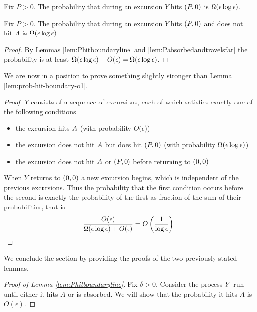 {\begin{lemma}
  \label{lem:Pabsorbedandtravelsfar}
  Fix $P > 0$.  The probability that during an excursion $Y$ hits $(P,0)$
  is $\Omega(\epsilon\log\epsilon)$.
\end{lemma}

\begin{lemma*}
  Fix $P > 0$.  The probability that during an excursion $Y$ hits $(P,0)$
  and does not hit $A$ is $\Omega(\epsilon\log\epsilon)$.
\end{lemma*}

\begin{proof}
  By Lemmas \ref{lem:Phitboundaryline} and
  \ref{lem:Pabsorbedandtravelsfar} the probability is at least
  $\Omega(\epsilon\log\epsilon) - O(\epsilon) = \Omega(\epsilon\log\epsilon)$.
\end{proof}

We are now in a position to prove something slightly stronger than
Lemma \ref{lem:prob-hit-boundary-o1}.

\begin{lemma*}
\end{lemma*}

\newcommand{\Oe}{O(\epsilon)}

\begin{proof}
  $Y$ consists of a sequence of excursions, each of which satisfies
  exactly one of the following conditions
  \begin{itemize}
  \item the excursion hits $A$ (with probability
    $O(\epsilon$))
  \item the excursion does not hit $A$ but does hit
    $(P,0)$ (with probability $\Omega(\epsilon\log\epsilon)$)
  \item the excursion does not hit $A$ or $(P,0)$ before
    returning to $(0,0)$
  \end{itemize}
  When $Y$ returns to $(0,0)$ a new excursion begins, which is independent of
  the previous excursions.  Thus the probability that the first
  condition occurs before the second is exactly the probability of the
  first as fraction of the sum of their probabilities, that is
  \[
  \frac{\Oe}{\Omegaeloge + \Oe} = O\left(\frac{1}{\log\epsilon}\right)
  \]
\end{proof}

We conclude the section by providing the proofs of the two previously
stated lemmas.

\begin{proof}[Proof of Lemma \ref{lem:Phitboundaryline}]
Fix $\delta > 0$.  Consider the process $Y$ run until either
it hits $A$ or is absorbed.  We will show that the probability it
hits $A$ is $O(\epsilon)$.


\end{proof}}
